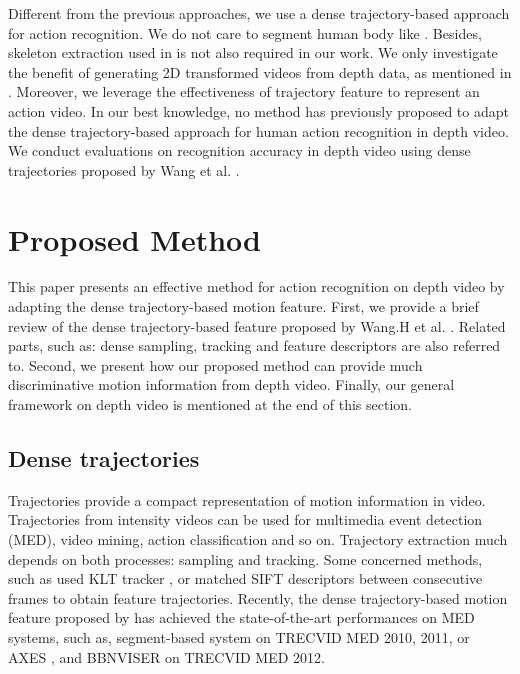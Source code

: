 \documentclass[final,3p,times,twocolumn]{elsarticle}
\begin{document}
Different from the previous approaches, we use a dense trajectory-based approach for action recognition. We do not care to segment human body like \cite{li2010action,yang2012recognizing}. Besides, skeleton extraction used in \cite{yang2012eigenjoints, wang2012mining} is not also required in our work. We only investigate the benefit of generating 2D transformed videos from depth data, as mentioned in \cite{li2010action,yang2012recognizing}. Moreover, we leverage the effectiveness of trajectory feature to represent an action video. In our best knowledge, no method has previously proposed to adapt the dense trajectory-based approach for human action recognition in depth video. We conduct evaluations on recognition accuracy in depth video using dense trajectories proposed by Wang et al. \cite{wang2011densetraj}.

\section{Proposed Method}
\label{lbl:ProposedMethod}

This paper presents an effective method for action recognition on depth video by adapting the dense trajectory-based motion feature. First, we provide a brief review of the dense trajectory-based feature proposed by Wang.H et al. \cite{wang2011densetraj}. Related parts, such as: dense sampling, tracking and feature descriptors are also referred to. Second, we present how our proposed method can provide much discriminative motion information from depth video. Finally, our general framework on depth video is mentioned at the end of this section.

\subsection{Dense trajectories}
Trajectories provide a compact representation of motion information in video.
Trajectories from intensity videos can be used for multimedia event detection (MED), video mining, action classification and so on.
Trajectory extraction much depends on both processes: sampling and tracking.
Some concerned methods, such as \cite{matikainen2009trajectons, messing2009activity} used KLT tracker \cite{lucas1981iterative}, or \cite{sun2009hierarchical} matched SIFT descriptors between consecutive frames to obtain feature trajectories.
Recently, the dense trajectory-based motion feature proposed by \cite{wang2011densetraj} has achieved the state-of-the-art performances on MED systems, such as, segment-based system \cite{phan2014multimedia} on TRECVID MED 2010, 2011, or AXES \cite{oneata2012axes}, and BBNVISER \cite{natarajan2012bbn} on TRECVID MED 2012.
\end{document}
